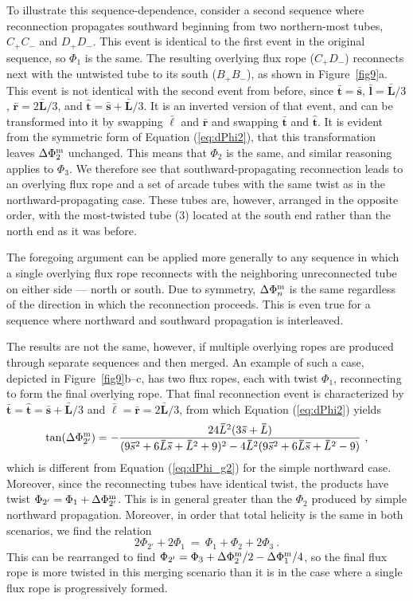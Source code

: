 \documentclass[10pt,namedreferneces]{SolarPhysics}
\begin{document}
\begin{article}
To illustrate this sequence-dependence, consider a second sequence where reconnection propagates southward beginning from two northern-most tubes, $C_+C_-$ and $D_+D_-$.  This event is identical to the first event in the original sequence, so $\Phi_1$ is the same.  The resulting overlying flux rope ($C_+D_-$) reconnects next with the untwisted tube to its south ($B_+B_-$), as shown in Figure\ \ref{fig9}a.   This event is not identical with the second event from before, since $\bm\bar{t}=\bm\bar{s}$, $\bm\bar{l}=\bm\bar{L}/3$, $\bm\bar{r}=2\bm\bar{L}/3$, and $\bm\hat{t}=\bm\bar{s}+\bm\bar{L}/3$.  
It is an inverted version of that event, and can be transformed into it by swapping $\bm\bar{\ell}$ and $\bm\bar{r}$ and swapping $\bm\bar{t}$ and $\bm\hat{t}$.  It is evident from the symmetric form of Equation  (\ref{eq:dPhi2}), that this transformation leaves $\Delta\Phi^{\rm m}_2$ unchanged.  This means that $\Phi_2$ is the same, and similar reasoning applies to $\Phi_3$.  We therefore see that southward-propagating reconnection leads to an overlying flux rope and a set of arcade tubes with the same twist as in the northward-propagating case.  These tubes are, however, arranged in the opposite order, with the most-twisted tube ($3$) located at the south end rather than the north end as it was before.

The foregoing argument can be applied more generally to any sequence in which a single overlying flux rope reconnects with the neighboring unreconnected tube on either side --- north or south.  Due to symmetry, $\Delta\Phi^{\rm m}_n$ is the same regardless of the direction in which the reconnection proceeds.  This is even true for a sequence where northward and southward propagation is interleaved.  

The results are not the same, however, if multiple overlying ropes are produced through separate sequences and then merged.  An example of such a case, depicted in Figure\ \ref{fig9}b--c, has two flux ropes, each with twist 
$\Phi_1$, reconnecting to form the final overlying rope.  That final reconnection event is characterized by $\bm\bar{t}=\bm\hat{t}=\bm\bar{s}+\bm\bar{L}/3$ and $\bm\bar{\ell}=\bm\bar{r}=2\bm\bar{L}/3$, from which Equation 
(\ref{eq:dPhi2}) yields
\begin{equation}
  \tan(\Delta\Phi^{\rm m}_{2'}) = -{24\bm\bar{L}^2(3\bm\bar{s}+\bm\bar{L})\over (9\bm\bar{s}^2 + 6\bm\bar{L}\bm\bar{s} +\bm\bar{L}^2 +9)^2 - 4\bm\bar{L}^2(9\bm\bar{s}^2 + 
  6\bm\bar{L}\bm\bar{s} +\bm\bar{L}^2 - 9 )} ~,
    	\label{eq:dPhi_g2p}
\end{equation}
which is different from Equation  (\ref{eq:dPhi_g2}) for the simple northward case.  Moreover, since the reconnecting tubes have identical twist, the products have twist
$\Phi_{2'}=\Phi_1+\Delta\Phi^{\rm m}_{2'}$.  This is in general greater than the $\Phi_2$ produced by simple northward propagation.  Moreover, in order that total helicity is the same in both scenarios, we find the relation
\[
  2\Phi_{2'}+2\Phi_1 ~=~ \Phi_1+\Phi_2+2\Phi_3 ~.
\]
This can be rearranged to find $\Phi_{2'}=\Phi_3+\Delta\Phi_2^{\rm m}/2-\Delta\Phi^{\rm m}_1/4$, so the final flux rope is more twisted in this merging scenario than it is in the case where a single flux rope is progressively formed.


\end{article}
\end{document}
